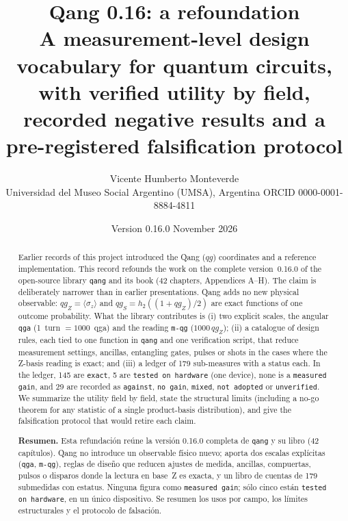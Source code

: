 \documentclass[11pt]{article}
\title{Qang 0.16: a refoundation\\
\large A measurement-level design vocabulary for quantum circuits,\\
with verified utility by field, recorded negative results and a pre-registered falsification protocol}
\author{Vicente Humberto Monteverde\\
\small Universidad del Museo Social Argentino (UMSA), Argentina \quad ORCID 0000-0001-8884-4811}
\date{\small Version 0.16.0 \quad 16 November 2026}
\newcommand{\qgZ}{qg_Z}
\newcommand{\qgS}{qg_S}
\newcommand{\st}[1]{\texttt{#1}}
\begin{document}
\maketitle
\begin{abstract}
\noindent Earlier records of this project introduced the Qang ($qg$) coordinates and a reference implementation. This record refounds the work on the complete version~0.16.0 of the open-source library \texttt{qang} and its book (42 chapters, Appendices A--H). The claim is deliberately narrower than in earlier presentations. Qang adds no new physical observable: $\qgZ=\langle\sigma_z\rangle$ and $\qgS=h_2((1+\qgZ)/2)$ are exact functions of one outcome probability. What the library contributes is (i) two explicit scales, the angular \st{qga} (1~turn $=1000$~qga) and the reading \st{m-qg} ($1000\,\qgZ$); (ii) a catalogue of design rules, each tied to one function in \texttt{qang} and one verification script, that reduce measurement settings, ancillas, entangling gates, pulses or shots in the cases where the Z-basis reading is exact; and (iii) a ledger of 179 sub-measures with a status each. In the ledger, 145 are \st{exact}, 5 are \st{tested on hardware} (one device), none is a \st{measured gain}, and 29 are recorded as \st{against}, \st{no gain}, \st{mixed}, \st{not adopted} or \st{unverified}. We summarize the utility field by field, state the structural limits (including a no-go theorem for any statistic of a single product-basis distribution), and give the falsification protocol that would retire each claim.

\medskip\noindent\textbf{Resumen.} Esta refundación reúne la versión 0.16.0 completa de \texttt{qang} y su libro (42 capítulos). Qang no introduce un observable físico nuevo; aporta dos escalas explícitas (\st{qga}, \st{m-qg}), reglas de diseño que reducen ajustes de medida, ancillas, compuertas, pulsos o disparos donde la lectura en base~Z es exacta, y un libro de cuentas de 179 submedidas con estatus. Ninguna figura como \st{measured gain}; sólo cinco están \st{tested on hardware}, en un único dispositivo. Se resumen los usos por campo, los límites estructurales y el protocolo de falsación.
\end{abstract}
\end{document}
